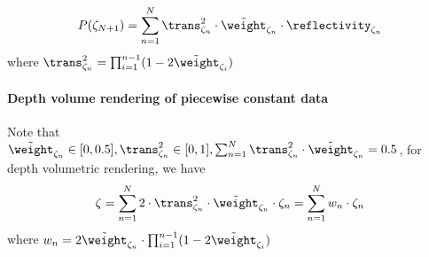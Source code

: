 \begin{align}
P(\zeta_{N+1}) = \sum_{n=1}^N \trans^2_{\zeta_n} \cdot \tilde{\weight}_{\zeta_n} \cdot \reflectivity_{\zeta_n}
\label{eq:final_radiant2}
\end{align}
where $\trans^2_{\zeta_n} = \prod_{i=1}^{n-1}(1-2\tilde{\weight}_{\zeta_i})$


\paragraph{Depth volume rendering of piecewise constant data}
Note that $\tilde{\weight}_{\zeta_n} \in [0, 0.5], \trans^2_{\zeta_n} \in [0,1], \sum_{n=1}^N \trans^2_{\zeta_n} \cdot \tilde{\weight}_{\zeta_n} = 0.5$, for depth volumetric rendering, we have 
\begin{align}
    \zeta = \sum_{n=1}^N 2 \cdot \trans^2_{\zeta_n} \cdot \tilde{\weight}_{\zeta_n} \cdot \zeta_n
    =\sum_{n=1}^N w_n \cdot \zeta_n
    \label{eq:depth_render}
\end{align}
where $w_n = 2\tilde{\weight}_{\zeta_n} \cdot \prod_{i=1}^{n-1}(1-2\tilde{\weight}_{\zeta_i})$